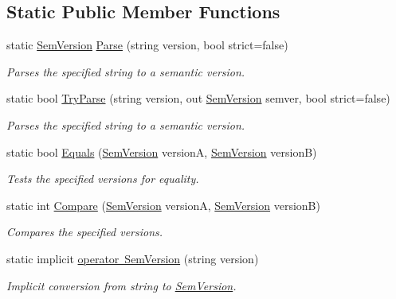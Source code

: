\subsection*{Static Public Member Functions}
\begin{DoxyCompactItemize}
\item 
static \mbox{\hyperlink{class_semver_1_1_sem_version}{Sem\+Version}} \mbox{\hyperlink{class_semver_1_1_sem_version_a3928bdf405e6d854e400d2fbd5cd0164}{Parse}} (string version, bool strict=false)
\begin{DoxyCompactList}\small\item\em Parses the specified string to a semantic version. \end{DoxyCompactList}\item 
static bool \mbox{\hyperlink{class_semver_1_1_sem_version_a1c84a5d72f5353be5149eb045827fd7b}{Try\+Parse}} (string version, out \mbox{\hyperlink{class_semver_1_1_sem_version}{Sem\+Version}} semver, bool strict=false)
\begin{DoxyCompactList}\small\item\em Parses the specified string to a semantic version. \end{DoxyCompactList}\item 
static bool \mbox{\hyperlink{class_semver_1_1_sem_version_a6d469a3a2b0caf2d0edecda486f86464}{Equals}} (\mbox{\hyperlink{class_semver_1_1_sem_version}{Sem\+Version}} versionA, \mbox{\hyperlink{class_semver_1_1_sem_version}{Sem\+Version}} versionB)
\begin{DoxyCompactList}\small\item\em Tests the specified versions for equality. \end{DoxyCompactList}\item 
static int \mbox{\hyperlink{class_semver_1_1_sem_version_a60f0e0c81e54b95ad9cd72526480f39b}{Compare}} (\mbox{\hyperlink{class_semver_1_1_sem_version}{Sem\+Version}} versionA, \mbox{\hyperlink{class_semver_1_1_sem_version}{Sem\+Version}} versionB)
\begin{DoxyCompactList}\small\item\em Compares the specified versions. \end{DoxyCompactList}\item 
static implicit \mbox{\hyperlink{class_semver_1_1_sem_version_a2d0eef22f96f4ed95c48b851363c58d5}{operator Sem\+Version}} (string version)
\begin{DoxyCompactList}\small\item\em Implicit conversion from string to \mbox{\hyperlink{class_semver_1_1_sem_version}{Sem\+Version}}. \end{DoxyCompactList}\item 

\end{DoxyCompactItemize}
